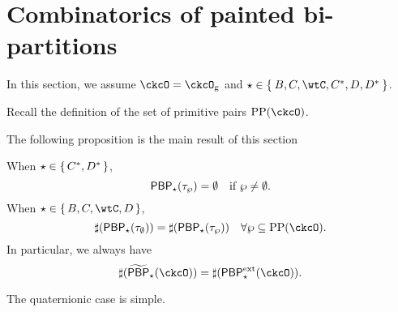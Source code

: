 \documentclass[counting_main.tex]{subfiles}
\begin{document}
\section{Combinatorics of painted bi-partitions}

In this section, we assume $\ckcO = \ckcOg$ and
$\star \in \Set{B,C,\wtC,C^{*},D,D^{*}}$.

Recall the definition of the set of primitive pairs $\CPP(\ckcO)$.

The following proposition is the main result of this section
\begin{prop} \label{prop:PBP} When $\star\in \set{C^{*}, D^{*}}$,
  \[
    \mathsf{PBP}_{\star}(\tau_{\wp}) = \emptyset \quad \text{if } \wp \neq \emptyset.
  \]
  When $\star\in \set{B,C,\wtC,D}$,
  \[
    \sharp(\PBP_{\star}(\tau_{\emptyset})) = \sharp(\PBP_{\star}(\tau_{\wp})) \quad \forall \wp \subseteq \CPP(\ckcO).
  \]
  In particular, we always have
  \[
    \sharp(\tPBP_{\star}(\ckcO)) = \sharp(\PBPe_{\star}(\ckcO)).
  \]
\end{prop}


The quaternionic case is simple.
\end{document}
